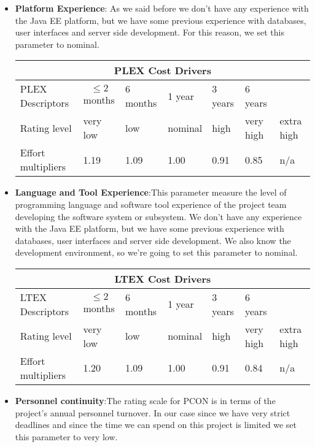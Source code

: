 \begin{itemize}
\item \textbf{Platform Experience}:
As we said before we don’t have any experience with the Java EE platform, but
we have some previous experience with databases, user interfaces
and server side development. For this reason, we set
this parameter to nominal.

\begin{longtable}{| m{}| m{} | m{} | m{} | m{} | m{} | m{}| }
\hline
\multicolumn{7}{c}{PLEX Cost Drivers}\\
\hline
\hline
PLEX Descriptors & \begin{equation*}
{\le 2}
\end{equation*} months  & 6 months & 1 year & 3 years & 6 years & \\
\hline
Rating level & very low & low & nominal & high & very high & extra high \\
\hline
Effort multipliers & 1.19 & 1.09 & 1.00 & 0.91 & 0.85 & n/a \\
\hline
\end{longtable}

\item\textbf{Language and Tool Experience}:This parameter measure the level of programming language and software tool experience of the project team developing the software system or subsystem. We don’t have any experience with the Java EE platform, but we have some previous experience with databases, user interfaces and server side development. We also know the development environment, so we’re going to set this parameter to nominal.

\begin{longtable}{| m{}| m{} | m{} | m{} | m{} | m{} | m{}| }
\hline
\multicolumn{7}{c}{LTEX Cost Drivers}\\
\hline
\hline
LTEX Descriptors & \begin{equation*}
{\le 2}
\end{equation*} months  & 6 months & 1 year & 3 years & 6 years & \\
\hline
Rating level & very low & low & nominal & high & very high & extra high \\
\hline
Effort multipliers & 1.20 & 1.09 & 1.00 & 0.91 & 0.84 & n/a \\
\hline
\end{longtable}

\item \textbf{Personnel continuity}:The rating scale for PCON is in terms of the project's annual personnel turnover. In our case since we have very strict deadlines and since the time we can
spend on this project is limited we set this parameter to very low.


\end{itemize}
